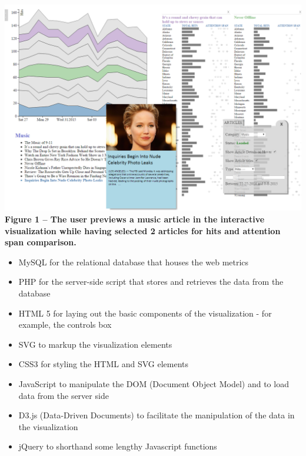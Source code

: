 \documentclass[12pt]{article}
\begin{document}
\noindent\includegraphics[scale=0.4]{img/in_action} \\

\noindent\textbf{Figure 1 -- The user previews a music article in the interactive visualization while having selected 2 articles for hits and attention span comparison.}


\newpage

\begin{itemize}
\item MySQL for the relational database that houses the web metrics
\item PHP for the server-side script that stores and retrieves the data from the database
\item HTML 5 for laying out the basic components of the visualization - for example, the controls box
\item SVG to markup the visualization elements
\item CSS3 for styling the HTML and SVG elements
\item JavaScript to manipulate the DOM (Document Object Model) and to load data from the server side
\item D3.js (Data-Driven Documents) to facilitate the manipulation of the data in the visualization
\item jQuery to shorthand some lengthy Javascript functions
\end{itemize}


\end{document}
